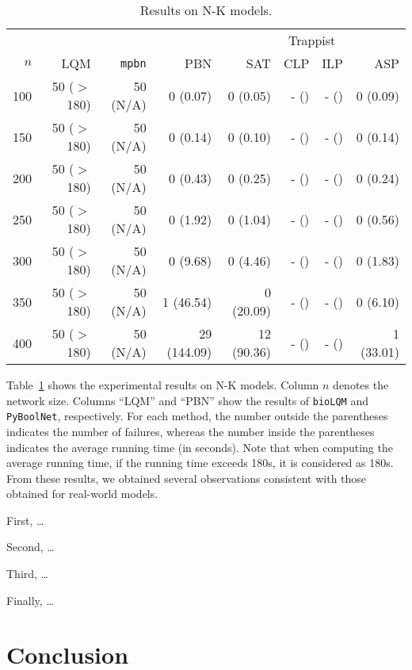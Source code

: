 \documentclass[preprint,12pt]{elsarticle}
\begin{document}
\begin{table}[!htb]
  \caption{Results on N-K models.}
  \centering%
  \label{tab:result_N_K}
  \begin{tabular}{rrrrrrrr}
    \toprule
    & & & & \multicolumn{4}{c}{Trappist}\\
    \cmidrule(rr){5-8}
    \(n\) & LQM & \texttt{mpbn} & PBN & SAT & CLP & ILP & ASP \\
    \midrule
    100 & 50 ($>$ 180) & 50 (N/A) & 0 (0.07) & 0 (0.05) & - () & - () & 0 (0.09) \\
    150 & 50 ($>$ 180) & 50 (N/A) & 0 (0.14) & 0 (0.10) & - () & - () & 0 (0.14) \\
    200 & 50 ($>$ 180) & 50 (N/A) & 0 (0.43) & 0 (0.25) & - () & - () & 0 (0.24) \\
    250 & 50 ($>$ 180) & 50 (N/A) & 0 (1.92) & 0 (1.04) & - () & - () & 0 (0.56) \\
    300 & 50 ($>$ 180) & 50 (N/A) & 0 (9.68) & 0 (4.46) & - () & - () & 0 (1.83) \\
    350 & 50 ($>$ 180) & 50 (N/A) & 1 (46.54) & 0 (20.09) & - () & - () & 0 (6.10) \\
    400 & 50 ($>$ 180) & 50 (N/A) & 29 (144.09) & 12 (90.36) & - () & - () & 1 (33.01) \\
    \bottomrule
  \end{tabular}
\end{table}

Table~\ref{tab:result_N_K} shows the experimental results on N-K models.
Column \(n\) denotes the network size.
Columns ``LQM'' and ``PBN'' show the results of \texttt{bioLQM} and \texttt{PyBoolNet}, respectively.
For each method, the number outside the parentheses indicates the number of failures, whereas the number inside the parentheses indicates the average running time (in seconds).
Note that when computing the average running time, if the running time exceeds 180s, it is considered as 180s.
From these results, we obtained several observations consistent with those obtained for real-world models.

First, \dots

Second, \dots

Third, \dots

Finally, \dots

\section{Conclusion}
\label{sec:Conclusion}
\end{document}
